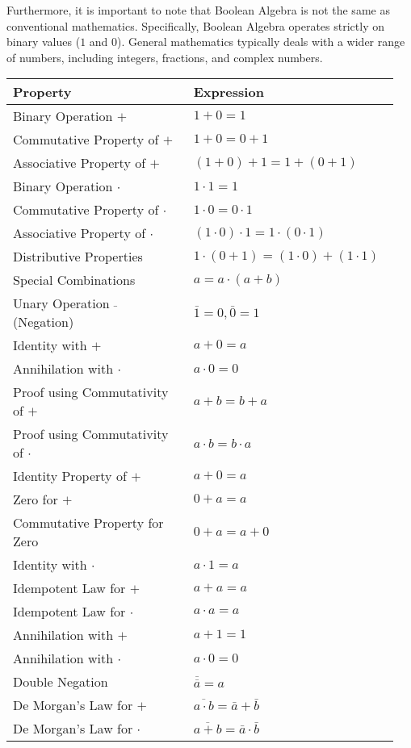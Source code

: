 \documentclass[12pt,a4paper,openany]{article}
\begin{document}
Furthermore, it is important to note that Boolean Algebra is not the
same as conventional mathematics. Specifically, Boolean Algebra operates
strictly on binary values ($1$ and $0$). General mathematics
typically deals with a wider range of numbers, including integers,
fractions, and complex numbers.

\begin{center}
\begin{tabular}{|p{0.45\linewidth}|p{0.50\linewidth}|}
\hline
\textbf{Property} & \textbf{Expression} \\
\hline
Binary Operation $+$ & $1 + 0 = 1$ \\
\hline
Commutative Property of $+$ & $1 + 0 = 0 + 1$ \\
\hline
Associative Property of $+$ & $(1 + 0) + 1 = 1 + (0 + 1)$ \\
\hline
Binary Operation $\cdot$ & $1 \cdot 1 = 1$ \\
\hline
Commutative Property of $\cdot$ & $1 \cdot 0 = 0 \cdot 1$ \\
\hline
Associative Property of $\cdot$ & $(1 \cdot 0) \cdot 1 = 1 \cdot (0 \cdot 1)$ \\
\hline
Distributive Properties & $1 \cdot (0 + 1) = (1 \cdot 0) + (1 \cdot 1)$ \\
\hline
Special Combinations & $a = a \cdot (a + b)$ \\
\hline
Unary Operation $\bar{}$ (Negation) & $\bar{1} = 0, \bar{0} = 1$ \\
\hline
Identity with $+$ & $a + 0 = a$ \\
\hline
Annihilation with $\cdot$ & $a \cdot 0 = 0$ \\
\hline
Proof using Commutativity of $+$ & $a + b = b + a$ \\
\hline
Proof using Commutativity of $\cdot$ & $a \cdot b = b \cdot a$ \\
\hline
Identity Property of $+$ & $a + 0 = a$ \\
\hline
Zero for $+$ & $0 + a = a$ \\
\hline
Commutative Property for Zero & $0 + a = a + 0$ \\
\hline
Identity with $\cdot$ & $a \cdot 1 = a$ \\
\hline
Idempotent Law for $+$ & $a + a = a$ \\
\hline
Idempotent Law for $\cdot$ & $a \cdot a = a$ \\
\hline
Annihilation with $+$ & $a + 1 = 1$ \\
\hline
Annihilation with $\cdot$ & $a \cdot 0 = 0$ \\
\hline
Double Negation & $\overline{\overline{a}} = a$ \\
\hline
De Morgan's Law for $+$ & $\overline{a \cdot b} = \bar{a} + \bar{b}$ \\
\hline
De Morgan's Law for $\cdot$ & $\overline{a + b} = \bar{a} \cdot \bar{b}$ \\
\hline
\end{tabular}
\end{center}
\end{document}
